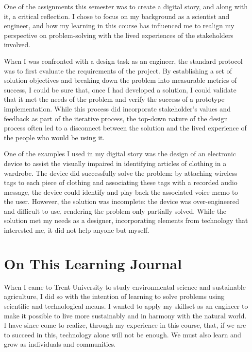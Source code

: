 \documentclass{report}
\begin{document}
\hspace{24pt} One of the assignments this semester was to create a digital story, and along with it, a critical reflection. I chose to focus on my background as a scientist and engineer, and how my learning in this course has influenced me to realign my perspective on problem-solving with the lived experiences of the stakeholders involved.

\hspace{24pt} When I was confronted with a design task as an engineer, the standard protocol was to first evaluate the requirements of the project. By establishing a set of solution objectives and breaking down the problem into measurable metrics of success, I could be sure that, once I had developed a solution, I could validate that it met the needs of the problem and verify the success of a prototype implementation. While this process did incorporate stakeholder's values and feedback as part of the iterative process, the top-down nature of the design process often led to a disconnect between the solution and the lived experience of the people who would be using it.

\hspace{24pt} One of the examples I used in my digital story was the design of an electronic device to assist the visually impaired in identifying articles of clothing in a wardrobe. The device did successfully solve the problem: by attaching wireless tags to each piece of clothing and associating these tags with a recorded audio message, the device could identify and play back the associated voice memo to the user. However, the solution was incomplete: the device was over-engineered and difficult to use, rendering the problem only partially solved. While the solution met my needs as a designer, incorporating elements from technology that interested me, it did not help anyone but myself.


\section{On This Learning Journal}

\hspace{24pt} When I came to Trent University to study environmental science and sustainable agriculture, I did so with the intention of learning to solve problems using scientific and technological means. I wanted to apply my skillset as an engineer to make it possible to live more sustainably and in harmony with the natural world. I have since come to realize, through my experience in this course, that, if we are to succeed in this, technology alone will not be enough. We must also learn and grow as individuals and communities.
\end{document}
